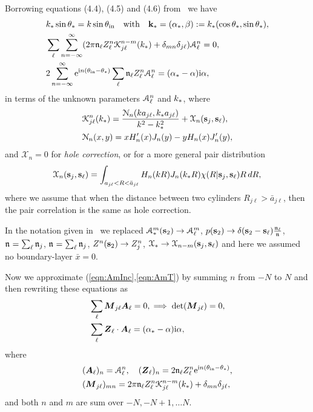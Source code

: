 \documentclass[12pt, a4paper]{article}
\begin{document}
Borrowing equations (4.4), (4.5) and (4.6) from~\cite{gower_reflection_2017} we have
\begin{align}
    &k_* \sin \theta_* = k \sin \theta_{\mathrm{in}}  \quad \text{with} \quad \mathbf k_* =(\alpha_*, \beta) := k_*(\cos\theta_*, \sin\theta_*),
    \label{eqn:Snells}
  \\
    &  \sum_\ell \sum_{n=-\infty}^\infty ( 2 \pi\mathfrak n_{\ell} Z^n_\ell
  \mathcal K^{n-m}_{j \ell}(k_*) + \delta_{m n} \delta_{j \ell}  ) \mathcal A^n_\ell
   = 0,
 \label{eqn:AmT}
\\
  &
   2\sum_{n=-\infty}^\infty \textrm{e}^{\textrm{i} n (\theta_{\mathrm{in}} - \theta_*)} \sum_\ell
   \mathfrak n_{\ell} Z^n_\ell \mathcal A^n_\ell = (\alpha_*-\alpha) \textrm{i} \alpha,
 \label{eqn:AmInc}
 \end{align}
in terms of the unknown parameters $\mathcal A^n_\ell$ and $k_*$, where
\begin{align}
  &\mathcal K^n_{j \ell}(k_*) =  \frac{\mathcal N_{n}(ka_{j\ell},k_* a_{j\ell})}{k^2 - k_*^2}  +  \mathcal X_{n}(\mathbf s_j,\mathbf s_\ell),
   \\
  & \mathcal N_n(x,y) = x H_n'(x) J_n(y) - y H_n(x) J_n'(y),
\label{eqn:Nn}
\end{align}
and $\mathcal X_{n} = 0$ for {\it hole correction}, or for a more general pair distribution
\begin{equation}
   \mathcal X_{n}(\mathbf s_j,\mathbf s_\ell) =  \int_{a_{j \ell}< R < \bar a_{j \ell}} H_{n}(k R) J_{n}(k_* R) \chi(R | \mathbf s_j, \mathbf s_\ell)  R \, d R,
   \label{eqn:X_eff}
\end{equation}
where we assume that when the distance between two cylinders $R_{j \ell} > \bar a_{j \ell}$, then the pair correlation is the same as hole correction.

In the notation given in~\cite{gower_reflection_2017} we replaced $\mathcal A^m_*(\mathbf s_2) \to \mathcal A^m_\ell$, $p(\mathbf s_2) \to \delta(\mathbf s_2 - \mathbf s_\ell) \frac{\mathfrak n_{\ell}}{\mathfrak n_{}}$,  $\mathfrak n_{} = \sum_\ell \mathfrak n_{j}$, $\mathfrak n_{} = \sum_\ell \mathfrak n_{j}$,
$Z^n(\mathbf s_2) \to Z^n_j$, $\mathcal X_{*} \to \mathcal X_{n-m}(\mathbf s_j,\mathbf s_\ell)$ and here we assumed no boundary-layer $\bar x = 0$.

Now we approximate (\ref{eqn:AmInc},\ref{eqn:AmT}) by summing $n$ from $-N$ to $N$ and then rewriting these equations as
\begin{align}
    &  \sum_\ell \boldsymbol{M}_{j \ell} \boldsymbol{A}_\ell
   = 0, \implies \det (\boldsymbol{M}_{j \ell}) = 0,
   \label{eqn:secular}
\\
  &
    \sum_\ell
   \boldsymbol{Z}_\ell \cdot \boldsymbol{A}_\ell = (\alpha_*-\alpha) \textrm{i} \alpha,
   \label{eqn:effective_amplitude}
 \end{align}
where
\begin{align}
   & (\boldsymbol{A}_\ell)_n = \mathcal A^n_\ell, \quad  (\boldsymbol{Z}_\ell)_n =  2 \mathfrak n_{\ell} Z^n_\ell \textrm{e}^{\textrm{i} n (\theta_{\mathrm{in}} - \theta_*)},
   \\
   & (\boldsymbol{M}_{j \ell})_{mn} =  2 \pi\mathfrak n_{\ell} Z^n_\ell \mathcal K^{n-m}_{j \ell}(k_*) + \delta_{m n} \delta_{j \ell},
 \end{align}
and both $n$ and $m$ are sum over $-N, -N +1, \ldots N$.
\end{document}
